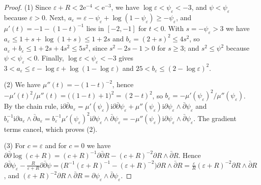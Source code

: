 \begin{proof}
(1) Since $\varepsilon+R<2\mathrm e^{-4}<\mathrm e^{-3}$, we have $\log\varepsilon<\psi_\varepsilon<-3$, and $\psi<\psi_\varepsilon$ because $\varepsilon>0$. Next, $a_\varepsilon=\varepsilon-\psi_\varepsilon+\log(1-\psi_\varepsilon)\geq-\psi_\varepsilon$, and $\mu'(t)=-1-(1-t)^{-1}$ lies in $[-2,-1]$ for $t<0$. With $s=-\psi_\varepsilon>3$ we have $a_\varepsilon\leq1+s+\log(1+s)\leq1+2s$ and $b_\varepsilon=(2+s)^2\leq4s^2$, so $a_\varepsilon+b_\varepsilon\leq1+2s+4s^2\leq5s^2$, since $s^2-2s-1>0$ for $s\geq3$; and $s^2\leq\psi^2$ because $\psi<\psi_\varepsilon<0$. Finally, $\log\varepsilon<\psi_\varepsilon<-3$ gives $3<a_\varepsilon\leq\varepsilon-\log\varepsilon+\log(1-\log\varepsilon)$ and $25<b_\varepsilon\leq(2-\log\varepsilon)^2$.

(2) We have $\mu''(t)=-(1-t)^{-2}$, hence $-\mu'(t)^2/\mu''(t)=\bigl((1-t)+1\bigr)^2=(2-t)^2$, so $b_\varepsilon=-\mu'(\psi_\varepsilon)^2/\mu''(\psi_\varepsilon)$. By the chain rule, $\mathrm i\partial\bar\partial a_\varepsilon=\mu'(\psi_\varepsilon)\mathrm i\partial\bar\partial\psi_\varepsilon+\mu''(\psi_\varepsilon)\mathrm i\partial\psi_\varepsilon\wedge\bar\partial\psi_\varepsilon$ and $b_\varepsilon^{-1}\mathrm i\partial a_\varepsilon\wedge\bar\partial a_\varepsilon=b_\varepsilon^{-1}\mu'(\psi_\varepsilon)^2\mathrm i\partial\psi_\varepsilon\wedge\bar\partial\psi_\varepsilon=-\mu''(\psi_\varepsilon)\mathrm i\partial\psi_\varepsilon\wedge\bar\partial\psi_\varepsilon$. The gradient terms cancel, which proves (2).

(3) For $c=\varepsilon$ and for $c=0$ we have $\partial\bar\partial\log(c+R)=(c+R)^{-1}\partial\bar\partial R-(c+R)^{-2}\partial R\wedge\bar\partial R$. Hence $\partial\bar\partial\psi_\varepsilon-\frac{R}{\varepsilon+R}\partial\bar\partial\psi=\bigl(R^{-1}(\varepsilon+R)^{-1}-(\varepsilon+R)^{-2}\bigr)\partial R\wedge\bar\partial R=\frac{\varepsilon}{R}(\varepsilon+R)^{-2}\partial R\wedge\bar\partial R$, and $(\varepsilon+R)^{-2}\partial R\wedge\bar\partial R=\partial\psi_\varepsilon\wedge\bar\partial\psi_\varepsilon$.
\end{proof}

